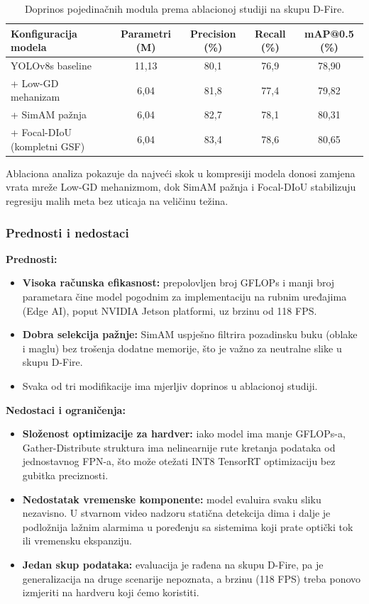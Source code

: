 \begin{table}[H]
\centering
\small
\begin{tabular}{@{}lcccc@{}}
  \toprule
  \textbf{Konfiguracija modela} & \textbf{Parametri (M)} & \textbf{Precision (\%)} & \textbf{Recall (\%)} & \textbf{mAP@0.5 (\%)}\\
  \midrule
  YOLOv8s baseline & 11,13 & 80,1 & 76,9 & 78,90\\
  + Low-GD mehanizam & 6,04 & 81,8 & 77,4 & 79,82\\
  + SimAM pažnja & 6,04 & 82,7 & 78,1 & 80,31\\
  + Focal-DIoU (kompletni GSF) & 6,04 & 83,4 & 78,6 & 80,65\\
  \bottomrule
\end{tabular}
\caption{Doprinos pojedinačnih modula prema ablacionoj studiji na skupu D-Fire.}
\label{tab:gsf-ablacija}
\end{table}
Ablaciona analiza pokazuje da najveći skok u kompresiji modela donosi zamjena vrata mreže Low-GD mehanizmom, dok SimAM pažnja i Focal-DIoU stabilizuju regresiju malih meta bez uticaja na veličinu težina.

\subsubsection{Prednosti i nedostaci}
\textbf{Prednosti:}
\begin{itemize}
  \item \textbf{Visoka računska efikasnost:} prepolovljen broj GFLOPs i manji broj parametara čine model pogodnim za implementaciju na rubnim uređajima (Edge AI), poput NVIDIA Jetson platformi, uz brzinu od 118 FPS.
  \item \textbf{Dobra selekcija pažnje:} SimAM uspješno filtrira pozadinsku buku (oblake i maglu) bez trošenja dodatne memorije, što je važno za neutralne slike u skupu D-Fire.
  \item Svaka od tri modifikacije ima mjerljiv doprinos u ablacionoj studiji.
\end{itemize}

\textbf{Nedostaci i ograničenja:}
\begin{itemize}
  \item \textbf{Složenost optimizacije za hardver:} iako model ima manje GFLOPs-a, Gather-Distribute struktura ima nelinearnije rute kretanja podataka od jednostavnog FPN-a, što može otežati INT8 TensorRT optimizaciju bez gubitka preciznosti.
  \item \textbf{Nedostatak vremenske komponente:} model evaluira svaku sliku nezavisno. U stvarnom video nadzoru statična detekcija dima i dalje je podložnija lažnim alarmima u poređenju sa sistemima koji prate optički tok ili vremensku ekspanziju.
  \item \textbf{Jedan skup podataka:} evaluacija je rađena na skupu D-Fire, pa je generalizacija na druge scenarije nepoznata, a brzinu (118 FPS) treba ponovo izmjeriti na hardveru koji ćemo koristiti.
\end{itemize}

